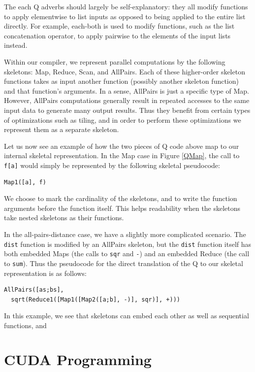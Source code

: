 \documentclass[preprint]{sigplanconf}
\begin{document}
The each Q adverbs should largely be self-explanatory: they all modify functions to apply elementwise to list inputs as opposed to being applied to the entire list directly.  For example, each-both is used to modify functions, such as the list concatenation operator, to apply pairwise to the elements of the input lists instead.

Within our compiler, we represent parallel computations by the following skeletons: Map, Reduce, Scan, and AllPairs.  Each of these higher-order skeleton functions takes as input another function (possibly another skeleton function) and that function's arguments.  In a sense, AllPairs is just a specific type of Map.  However, AllPairs computations generally result in repeated accesses to the same input data to generate many output results.  Thus they benefit from certain types of optimizations such as tiling, and in order to perform these optimizations we represent them as a separate skeleton.

Let us now see an example of how the two pieces of Q code above map to our internal skeletal representation.  In the Map case in Figure \ref{QMap}, the call to \texttt{f[a]} would simply be represented by the following skeletal pseudocode:

\begin{verbatim}
Map1([a], f)
\end{verbatim}

We choose to mark the cardinality of the skeletons, and to write the function arguments before the function itself.  This helps readability when the skeletons take nested skeletons as their functions.

In the all-pairs-distance case, we have a slightly more complicated scenario.  The \texttt{dist} function is modified by an AllPairs skeleton, but the \texttt{dist} function itself has both embedded Maps (the calls to \texttt{sqr} and \texttt{-}) and an embedded Reduce (the call to \texttt{sum}).  Thus the pseudocode for the direct translation of the Q to our skeletal representation is as follows:

\begin{verbatim}
AllPairs([as;bs],
  sqrt(Reduce1([Map1([Map2([a;b], -)], sqr)], +)))
\end{verbatim}

In this example, we see that skeletons can embed each other as well as sequential functions, and 

\section{CUDA Programming}
\label{GPU}
\end{document}
